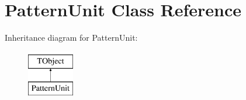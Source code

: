 \hypertarget{class_pattern_unit}{\section{Pattern\-Unit Class Reference}
\label{class_pattern_unit}
}
Inheritance diagram for Pattern\-Unit\-:\begin{figure}[H]
\begin{center}
\leavevmode
\includegraphics[height=2.000000cm]{class_pattern_unit}
\end{center}
\end{figure}
